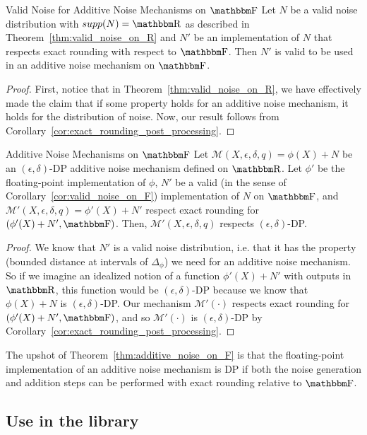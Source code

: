 \documentclass[11pt]{scrartcl} %
\begin{document}
\begin{corollary}
	\label{cor:valid_noise_on_F}
	Valid Noise for Additive Noise Mechanisms on $\F$ \newline
	Let $N$ be a valid noise distribution with $supp(N) = \R$ as described in Theorem~\ref{thm:valid_noise_on_R}
	and $N'$ be an implementation of $N$ that respects exact rounding with respect to $\F$.
	Then $N'$ is valid to be used in an additive noise mechanism on $\F$.

	\begin{proof}
		First, notice that in Theorem~\ref{thm:valid_noise_on_R}, we have
		effectively made the claim that if some property holds for an additive noise mechanism,
		it holds for the distribution of noise.
		Now, our result follows from Corollary~\ref{cor:exact_rounding_post_processing}.
	\end{proof}
\end{corollary}

\begin{theorem}
	\label{thm:additive_noise_on_F}
	Additive Noise Mechanisms on $\F$ \newline
	Let $\mathcal{M}(X, \epsilon, \delta, q) = \phi(X) + N$ be an $(\epsilon, \delta)$-DP additive noise mechanism
	defined on $\R$.
	Let $\phi'$ be the floating-point implementation of $\phi$,
	$N'$ be a valid (in the sense of Corollary~\ref{cor:valid_noise_on_F})
	implementation of $N$ on $\F$, and $\mathcal{M'}(X, \epsilon, \delta, q) = \phi'(X) + N'$
	respect exact rounding for $(\phi'(X)+N', \F)$.
	Then, $\mathcal{M'}(X, \epsilon, \delta, q)$ respects $(\epsilon, \delta)$-DP.

	\begin{proof}
		We know that $N'$ is a valid noise distribution, i.e. that it has the property (bounded distance at
		intervals of $\Delta_{\phi}$) we need for an additive noise mechanism.
		So if we imagine an idealized notion of a function $\phi'(X) + N'$ with outputs in $\R$,
		this function would be $(\epsilon, \delta)$-DP because we know that $\phi(X) + N$ is $(\epsilon, \delta)$-DP.
		Our mechanism $\mathcal{M'}(\cdot)$ respects exact rounding for $(\phi'(X) + N', \F)$, and so
		$\mathcal{M'}(\cdot)$ is $(\epsilon,\delta)$-DP by Corollary~\ref{cor:exact_rounding_post_processing}.
	\end{proof}
\end{theorem}
The upshot of Theorem~\ref{thm:additive_noise_on_F} is that the floating-point implementation of
an additive noise mechanism is DP if both the noise generation and addition steps can be performed
with exact rounding relative to $\F$.

\subsection{Use in the library}




\end{document}

